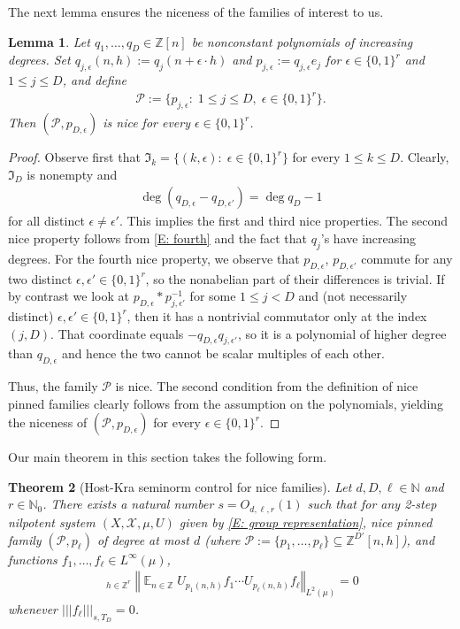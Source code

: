 \documentclass[11pt]{amsart}
\newtheorem{lemma}{Lemma}[section]
\newtheorem{theorem}[lemma]{Theorem}
\theoremstyle{definition}
\DeclareMathOperator*{\oE}{\overline{\mathbb{E}}}
\DeclareMathOperator*{\E}{\mathbb{E}}
\newcommand{\N}{{\mathbb N}}
\newcommand{\Z}{{\mathbb Z}}
\newcommand{\CP}{{\mathcal P}}
\newcommand{\CX}{{\mathcal X}}
\newcommand{\FI}{{\mathfrak I}}
\newcommand{\eps}{\epsilon}
\newcommand{\norm}[1]{\left\Vert #1\right\Vert}
\newcommand{\nnorm}[1]{\lvert\!|\!| #1|\!|\!\rvert}
\newcommand{\inv}{^{-1}}
\newcommand{\1}{{\mathbf{1}}}
\begin{document}
The next lemma ensures the niceness of the families of interest to us.
\begin{lemma}\label{L: niceness}
    Let $q_1, \ldots, q_D\in\Z[n]$ be nonconstant polynomials of increasing degrees. Set $q_{j,\eps}(n,h):=q_j(n+\eps\cdot h)$ and $p_{j,\eps}:=q_{j,\eps}e_j$ for $\eps\in\{0,1\}^{r}$ and $1\leq j \leq D$, and define
    \begin{align*}
        \CP := \{p_{j,\eps}\colon\; 1\leq j\leq D,\; \eps\in\{0,1\}^{r}\}.
    \end{align*}
     {Then $(\CP, p_{D,\eps})$ is nice for every $\eps\in\{0,1\}^{r}$.}
\end{lemma}
\begin{proof}
    Observe first that $\FI_k = \{(k,\eps)\colon\; \eps\in\{0,1\}^{r}\}$ for every $1\leq k\leq D$. Clearly, $\FI_D$ is nonempty and
    \begin{align}\label{E: fourth}
        \deg (q_{D,\eps} - q_{D,\eps'}) = \deg q_{D} - 1
    \end{align}
    for all distinct $\eps\neq \eps'$. This implies the first and third nice properties.
    The second nice property follows from \eqref{E: fourth} and the fact that $q_j$'s have increasing degrees.
     For the fourth nice property, we observe that $p_{D,\eps}$, $p_{D,\eps'}$ commute for any two distinct $\eps,\eps'\in\{0,1\}^{r}$, so the nonabelian part of their differences is trivial. If by contrast we look at $p_{D,\eps}*p_{j,\eps'}\inv$ for some $1\leq j<D$ and (not necessarily distinct) $\eps,\eps'\in\{0,1\}^{r}$, then it has a nontrivial commutator only at the index $(j,D)$. That coordinate equals $-q_{D,\eps}q_{j,\eps'}$, so it is a polynomial of higher degree than $q_{D,\eps}$ and hence the two cannot be scalar multiples of each other.

     Thus, the family $\CP$ is nice. The second condition from the definition of nice pinned families clearly follows from the assumption on the polynomials, yielding the niceness of $(\CP, p_{D,\eps})$ for every $\eps\in\{0,1\}^{r}$.
\end{proof}



Our main theorem in this section takes the following form.
\begin{theorem}[Host-Kra seminorm control for nice families]\label{T: nilpotent seminorm estimates for nice families}
    Let $d, D,\ell\in\N$ and $r\in\N_0$. There exists a natural number $s = O_{d,\ell, r}(1)$ such that for any 2-step nilpotent system $(X, \CX, \mu, U)$ given by \eqref{E: group representation}, {nice pinned family $(\CP, p_{\ell})$ of degree at most $d$} (where $\CP := \{p_1, \ldots, p_\ell\}\subseteq\Z^{D'}[n,h]$), and functions $f_1, \ldots, f_\ell\in L^\infty(\mu)$, 
    \begin{align*}
        \oE_{h\in \Z^{r}}\norm{\E_{n\in\Z}U_{p_1(n,h)}f_1\cdots U_{p_\ell(n,h)}f_\ell}_{L^2(\mu)} = 0
    \end{align*}
    whenever $\nnorm{f_\ell}_{s,T_D} = 0$. %
\end{theorem}
\end{document}
